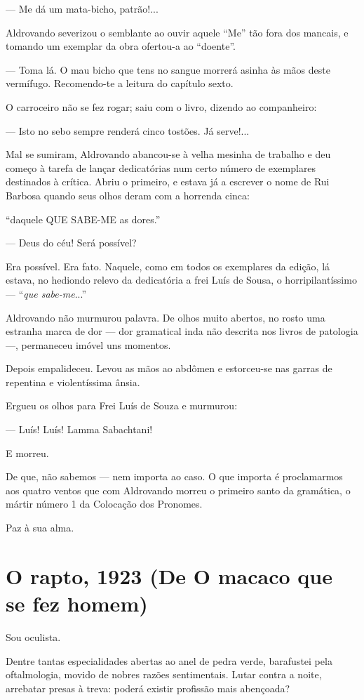 --- Me dá um mata-bicho, patrão!...

Aldrovando severizou o semblante ao ouvir aquele ``Me'' tão fora dos
mancais, e tomando um exemplar da obra ofertou-a ao ``doente''.

--- Toma lá. O mau bicho que tens no sangue morrerá asinha às mãos deste
vermífugo. Recomendo-te a leitura do capítulo sexto.

O carroceiro não se fez rogar; saiu com o livro, dizendo ao companheiro:

--- Isto no sebo sempre renderá cinco tostões. Já serve!...

Mal se sumiram, Aldrovando abancou-se à velha mesinha de trabalho e deu
começo à tarefa de lançar dedicatórias num certo número de exemplares
destinados à crítica. Abriu o primeiro, e estava já a escrever o nome de
Rui Barbosa quando seus olhos deram com a horrenda cinca:

``daquele QUE SABE-ME as dores.''

--- Deus do céu! Será possível?

Era possível. Era fato. Naquele, como em todos os exemplares da edição,
lá estava, no hediondo relevo da dedicatória a frei Luís de Sousa, o
horripilantíssimo --- ``\emph{que sabe-me}...''

Aldrovando não murmurou palavra. De olhos muito abertos, no rosto uma
estranha marca de dor --- dor gramatical inda não descrita nos livros de
patologia ---, permaneceu imóvel uns momentos.

Depois empalideceu. Levou as mãos ao abdômen e estorceu-se nas garras de
repentina e violentíssima ânsia.

Ergueu os olhos para Frei Luís de Souza e murmurou:

--- Luís! Luís! Lamma Sabachtani!

E morreu.

De que, não sabemos --- nem importa ao caso. O que importa é
proclamarmos aos quatro ventos que com Aldrovando morreu o primeiro
santo da gramática, o mártir número 1 da Colocação dos Pronomes.

Paz à sua alma.

\chapter{O rapto, 1923 (De O macaco que se fez homem)}

Sou oculista.

Dentre tantas especialidades abertas ao anel de pedra verde, barafustei
pela oftalmologia, movido de nobres razões sentimentais. Lutar contra a
noite, arrebatar presas à treva: poderá existir profissão mais
abençoada?

